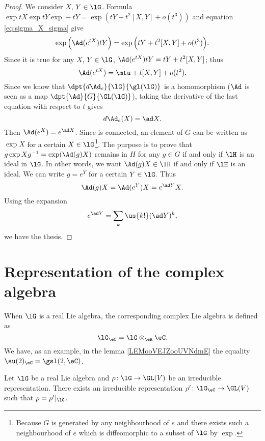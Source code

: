 \begin{proof}
	We consider $X$, $Y\in\lG$. Formula $\exp tX\exp tY\exp-tY=\exp( tY+t^2[X,Y]+o(t^3) )$ and equation \eqref{eq:sigma_X_sigma} give
	\[
		\exp\Big( \Ad(e^{tX})tY \Big)=\exp\Big(  tY+t^2[X,Y]+o(t^3)  \Big).
	\]
	Since it is true for any $X$, $Y\in\lG$, $\Ad(e^{tX})tY=tY+t^2[X,Y]$; thus
	\begin{equation}
		\Ad(e^{tX})=\mtu+t[X,Y]+o(t^2).
	\end{equation}
	Since we know that $\dpt{d\Ad_e}{\lG}{\gl(\lG)}$ is a homomorphism ($\Ad$ is seen as a map $\dpt{\Ad}{G}{\GL(\lG)}$), taking the derivative of the last equation with respect to $t$ gives
	\begin{equation}
		d\Ad_e(X)=\ad X.
	\end{equation}
	Then $\Ad(e^X)=e^{\ad X}$. Since is connected, an element of $G$ can be written as $\exp X$ for a certain $X\in\lG$\footnote{Because $G$ is generated by any neighbourhood of $e$ and there exists such a neighbourhood of $e$ which is diffeomorphic to a subset of $\lG$ by $\exp$.}. The purpose is to prove that $g\exp Xg^{-1}=\exp(\Ad(g)X)$ remains in $H$ for any $g\in G$ if and only if $\lH$ is an ideal in $\lG$. In other words, we want $\Ad(g)X\in\lH$ if and only if $\lH$ is an ideal. We can write $g=e^Y$ for a certain $Y\in\lG$. Thus
	\[
		\Ad(g)X=\Ad(e^Y)X=e^{\ad Y}X.
	\]
	Using the expansion
	\begin{equation}
		e^{\ad Y}=\sum_k\us{k!}(\ad Y)^k,
	\end{equation}
	we have the thesis.
\end{proof}

\section{Representation of the complex algebra}

When \(\lG \) is a real Lie algebra, the corresponding complex Lie algebra is defined as
\begin{equation}
	\lG_{\eC}=\lG\otimes_{\eR}\eC.
\end{equation}
We have, as an example, in the lemma \ref{LEMooVEJZooUVNdmE} the equality $\su(2)_{\eC}=\gsl(2,\eC)$.

\begin{lemma}        \label{LEMooIGAFooTSUsJR}
	Let \( \lG\) be a real Lie algebra and \( \rho\colon \lG\to \GL(V)\) be an irreducible representation. There exists an irreducible representation \( \rho'\colon \lG_{\eC}\to \GL(V)\) such that \( \rho=\rho'|_{\lG}\).
\end{lemma}

